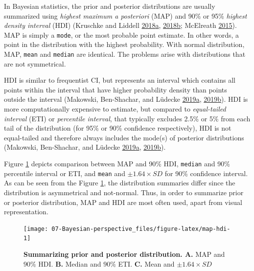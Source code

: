 \documentclass[
]{book}
\begin{document}
In Bayesian statistics, the prior and posterior distributions are usually summarized using \emph{highest maximum a posteriori} (MAP) and 90\% or 95\% \emph{highest density interval} (HDI) (Kruschke and Liddell \protect\hyperlink{ref-kruschkeBayesianDataAnalysis2018}{2018}\protect\hyperlink{ref-kruschkeBayesianDataAnalysis2018}{a}, \protect\hyperlink{ref-kruschkeBayesianNewStatistics2018}{2018}\protect\hyperlink{ref-kruschkeBayesianNewStatistics2018}{b}; McElreath \protect\hyperlink{ref-mcelreathStatisticalRethinkingBayesian2015}{2015}). MAP is simply a \texttt{mode}, or the most probable point estimate. In other words, a point in the distribution with the highest probability. With normal distribution, MAP, \texttt{mean} and \texttt{median} are identical. The problems arise with distributions that are not symmetrical.

HDI is similar to frequentist CI, but represents an interval which contains all points within the interval that have higher probability density than points outside the interval (Makowski, Ben-Shachar, and Lüdecke \protect\hyperlink{ref-makowskiBayestestRDescribingEffects2019}{2019}\protect\hyperlink{ref-makowskiBayestestRDescribingEffects2019}{a}, \protect\hyperlink{ref-makowskiUnderstandDescribeBayesian2019}{2019}\protect\hyperlink{ref-makowskiUnderstandDescribeBayesian2019}{b}). HDI is more computationally expensive to estimate, but compared to \emph{equal-tailed interval} (ETI) or \emph{percentile interval}, that typically excludes 2.5\% or 5\% from each tail of the distribution (for 95\% or 90\% confidence respectively), HDI is not equal-tailed and therefore always includes the mode(s) of posterior distributions (Makowski, Ben-Shachar, and Lüdecke \protect\hyperlink{ref-makowskiBayestestRDescribingEffects2019}{2019}\protect\hyperlink{ref-makowskiBayestestRDescribingEffects2019}{a}, \protect\hyperlink{ref-makowskiUnderstandDescribeBayesian2019}{2019}\protect\hyperlink{ref-makowskiUnderstandDescribeBayesian2019}{b}).

Figure \ref{fig:map-hdi} depicts comparison between MAP and 90\% HDI, \texttt{median} and 90\% percentile interval or ETI, and \texttt{mean} and \(\pm1.64 \times SD\) for 90\% confidence interval. As can be seen from the Figure \ref{fig:map-hdi}, the distribution summaries differ since the distribution is asymmetrical and not-normal. Thus, in order to summarize prior or posterior distribution, MAP and HDI are most often used, apart from visual representation.

\begin{figure}

{\centering \texttt{[image: 07-Bayesian-perspective\_files/figure-latex/map-hdi-1]} 

}

\caption{\textbf{Summarizing prior and posterior distribution. A. }MAP and \(90\%\) HDI. \textbf{B.} Median and \(90\%\) ETI. \textbf{C.} Mean and \(\pm1.64\times SD\)}\label{fig:map-hdi}
\end{figure}
\end{document}
